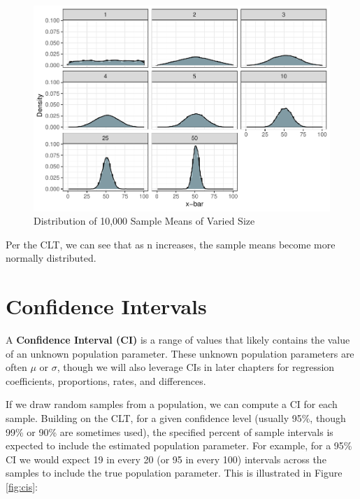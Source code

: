 \documentclass[]{book}
\begin{document}
\begin{figure}

{\centering \includegraphics{People_Analytics_Lifecycle_files/figure-latex/unnamed-chunk-42-1} 

}

\caption{Distribution of 10,000 Sample Means of Varied Size}\label{fig:unnamed-chunk-42}
\end{figure}

Per the CLT, we can see that as n increases, the sample means become more normally distributed.

\hypertarget{confidence-intervals}{%
\section{Confidence Intervals}\label{confidence-intervals}}

A \textbf{Confidence Interval (CI)} is a range of values that likely contains the value of an unknown population parameter. These unknown population parameters are often \(\mu\) or \(\sigma\), though we will also leverage CIs in later chapters for regression coefficients, proportions, rates, and differences.

If we draw random samples from a population, we can compute a CI for each sample. Building on the CLT, for a given confidence level (usually 95\%, though 99\% or 90\% are sometimes used), the specified percent of sample intervals is expected to include the estimated population parameter. For example, for a 95\% CI we would expect 19 in every 20 (or 95 in every 100) intervals across the samples to include the true population parameter. This is illustrated in Figure \ref{fig:cis}:
\end{document}
